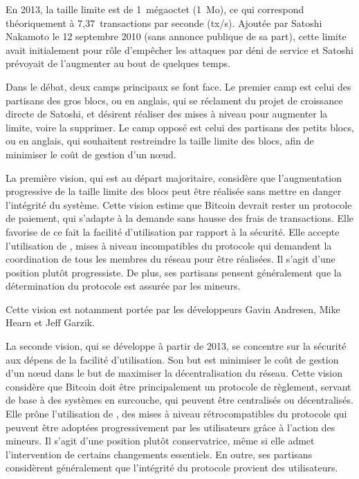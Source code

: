 En 2013, la taille limite est de 1~mégaoctet (1~Mo), ce qui correspond théoriquement à 7,37~transactions par seconde (tx/s). Ajoutée par Satoshi Nakamoto le 12 septembre 2010 (sans annonce publique de sa part), cette limite avait initialement pour rôle d'empêcher les attaques par déni de service et Satoshi prévoyait de l'augmenter au bout de quelques temps.

Dans le débat, deux camps principaux se font face. Le premier camp est celui des partisans des gros blocs, ou  en anglais, qui se réclament du projet de croissance directe de Satoshi, et désirent réaliser des mises à niveau pour augmenter la limite, voire la supprimer. Le camp opposé est celui des partisans des petits blocs, ou  en anglais, qui souhaitent restreindre la taille limite des blocs, afin de minimiser le coût de gestion d'un nœud.

La première vision, qui est au départ majoritaire, considère que l'augmentation progressive de la taille limite des blocs peut être réalisée sans mettre en danger l'intégrité du système. Cette vision estime que Bitcoin devrait rester un protocole de paiement, qui s'adapte à la demande sans hausse des frais de transactions. Elle favorise de ce fait la facilité d'utilisation par rapport à la sécurité. Elle accepte l'utilisation de , mises à niveau incompatibles du protocole qui demandent la coordination de tous les membres du réseau pour être réalisées. Il s'agit d'une position plutôt progressiste. De plus, ses partisans pensent généralement que la détermination du protocole est assurée par les mineurs. %

Cette vision est notamment portée par les développeurs Gavin Andresen, Mike Hearn et Jeff Garzik.

La seconde vision, qui se développe à partir de 2013, se concentre sur la sécurité aux dépens de la facilité d'utilisation. Son but est minimiser le coût de gestion d'un nœud dans le but de maximiser la décentralisation du réseau. Cette vision considère que Bitcoin doit être principalement un protocole de règlement, servant de base à des systèmes en surcouche, qui peuvent être centralisés ou décentralisés. Elle prône l'utilisation de , des mises à niveau rétrocompatibles du protocole qui peuvent être adoptées progressivement par les utilisateurs grâce à l'action des mineurs. Il s'agit d'une position plutôt conservatrice, même si elle admet l'intervention de certains changements essentiels. En outre, ses partisans considèrent généralement que l'intégrité du protocole provient des utilisateurs.  %

